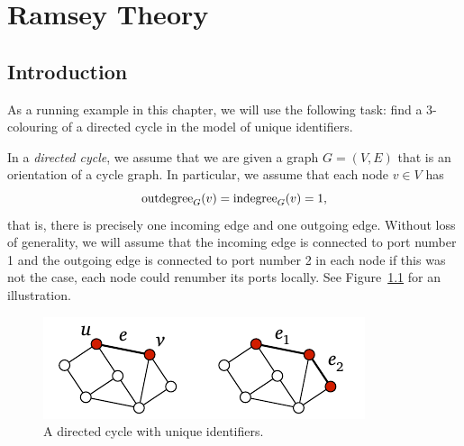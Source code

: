 \chapter{Ramsey Theory}

\section{Introduction}

As a running example in this chapter, we will use the following task: find a $3$-colouring of a directed cycle in the model of unique identifiers.

In a \emph{directed cycle}, we assume that we are given a graph $G = (V,E)$ that is an orientation of a cycle graph. In particular, we assume that each node $v \in V$ has
\[
    \operatorname{outdegree}_G(v) = \operatorname{indegree}_G(v) = 1,
\]
that is, there is precisely one incoming edge and one outgoing edge. Without loss of generality, we will assume that the incoming edge is connected to port number 1 and the outgoing edge is connected to port number 2 in each node \mydash if this was not the case, each node could renumber its ports locally. See Figure~\ref{fig:directed-cycle} for an illustration.

\begin{figure}
    \centering
    \includegraphics[page=\PDirectedCycle]{figs.pdf}
    \caption{A directed cycle with unique identifiers.}\label{fig:directed-cycle}
\end{figure}

